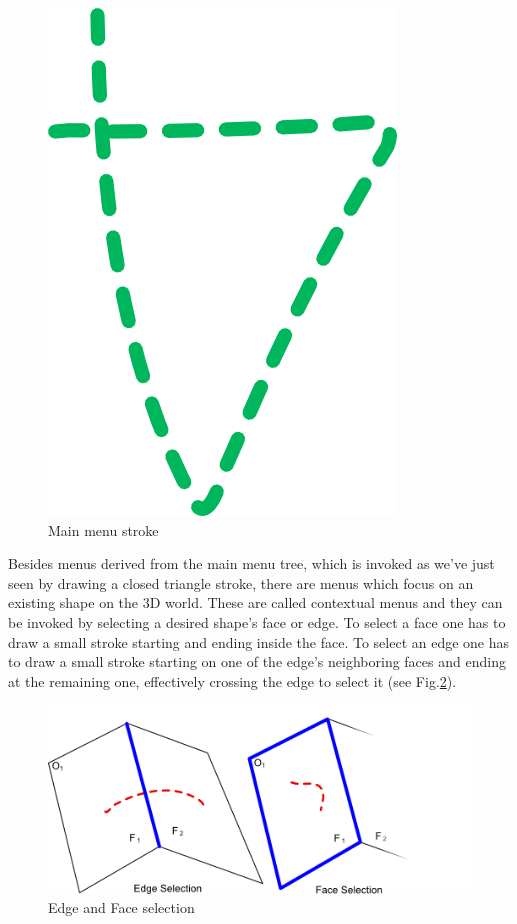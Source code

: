 \begin{figure}[ht]
	\centering
		\includegraphics[scale=0.75]{gfx/triangle.png}
	\caption{Main menu stroke}
	\label{fig:triangle}
\end{figure}


Besides menus derived from the main menu tree, which is invoked as we've just seen by drawing a closed triangle stroke,
there are menus which focus on an existing shape on the 3D world.
These are called contextual menus and they can be invoked by selecting a desired shape's face or edge.
To select a face one has to draw a small stroke starting and ending inside the face.
To select an edge one has to draw a small stroke starting on one of the edge's neighboring faces and ending at the remaining one,
effectively crossing the edge to select it (see Fig.\ref{fig:face-edge-selection}).


\begin{figure}[ht]
	\centering
		\includegraphics[scale=0.75]{gfx/face-edge-selection.png}
		\caption{Edge and Face selection}
	\label{fig:face-edge-selection}
\end{figure}



